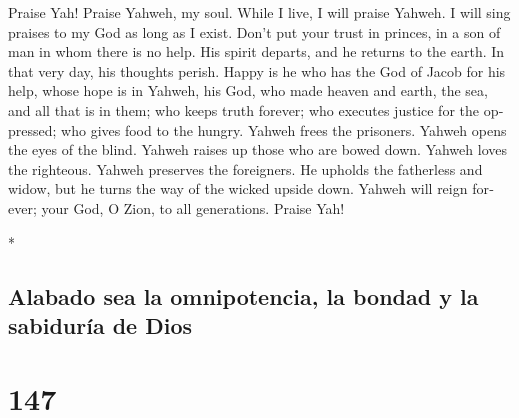 \begin{paracol}{2}
\begin{otherlanguage}{english}
 Praise Yah! Praise Yahweh, my soul.  While
I live, I will praise Yahweh. I will sing praises to my God as long as I
exist.  Don't put your trust in princes, in a son of man
in whom there is no help.  His spirit departs, and he
returns to the earth. In that very day, his thoughts perish.
 Happy is he who has the God of Jacob for his help, whose
hope is in Yahweh, his God,  who made heaven and earth,
the sea, and all that is in them; who keeps truth forever;
 who executes justice for the oppressed; who gives food to
the hungry. Yahweh frees the prisoners.  Yahweh opens the
eyes of the blind. Yahweh raises up those who are bowed down. Yahweh
loves the righteous.  Yahweh preserves the foreigners. He
upholds the fatherless and widow, but he turns the way of the wicked
upside down.  Yahweh will reign forever; your God, O
Zion, to all generations. Praise Yah!

\end{otherlanguage}

\switchcolumn[0]*

\hypertarget{alabado-sea-la-omnipotencia-la-bondad-y-la-sabiduruxeda-de-dios}{%
\subsection{Alabado sea la omnipotencia, la bondad y la sabiduría de
Dios}\label{alabado-sea-la-omnipotencia-la-bondad-y-la-sabiduruxeda-de-dios}}

\hypertarget{section-292}{%
\section{147}\label{section-292}}


\end{paracol}
